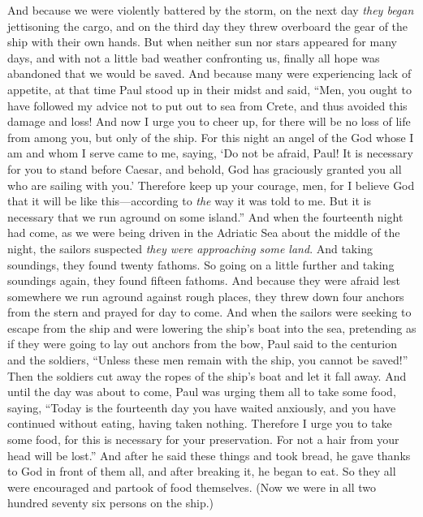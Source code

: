 \begin{biblechapter}
\verse And because we were violently battered by the storm, on the next day \textit{they began} jettisoning the cargo,
\verse and on the third day they threw overboard the gear of the ship with their own hands.
\verse But when neither sun nor stars appeared for many days, and with not a little bad weather confronting us, finally all hope was abandoned that we would be saved.
\verse And because many were experiencing lack of appetite, at that time Paul stood up in their midst and said, “Men, you ought to have followed my advice not to put out to sea from Crete, and thus avoided this damage and loss!
\verse And now I urge you to cheer up, for there will be no loss of life from among you, but only of the ship.
\verse For this night an angel of the God whose I am and whom I serve came to me,
\verse saying, ‘Do not be afraid, Paul! It is necessary for you to stand before Caesar, and behold, God has graciously granted you all who are sailing with you.’
\verse Therefore keep up your courage, men, for I believe God that it will be like this—according to \textit{the} way it was told to me.
\verse But it is necessary that we run aground on some island.”
\verse And when the fourteenth night had come, as we were being driven in the Adriatic Sea about the middle of the night, the sailors suspected \textit{they were approaching some land}.
\verse And taking soundings, they found twenty fathoms. So going on a little further and taking soundings again, they found fifteen fathoms.
\verse And because they were afraid lest somewhere we run aground against rough places, they threw down four anchors from the stern and prayed for day to come.
\verse And when the sailors were seeking to escape from the ship and were lowering the ship’s boat into the sea, pretending as if they were going to lay out anchors from the bow,
\verse Paul said to the centurion and the soldiers, “Unless these men remain with the ship, you cannot be saved!”
\verse Then the soldiers cut away the ropes of the ship’s boat and let it fall away.
\verse And until the day was about to come, Paul was urging them all to take some food, saying, “Today is the fourteenth day you have waited anxiously, and you have continued without eating, having taken nothing.
\verse Therefore I urge you to take some food, for this is necessary for your preservation. For not a hair from your head will be lost.”
\verse And after he said these things and took bread, he gave thanks to God in front of them all, and after breaking it, he began to eat.
\verse So they all were encouraged and partook of food themselves.
\verse (Now we were in all two hundred seventy six persons on the ship.)

\end{biblechapter}
